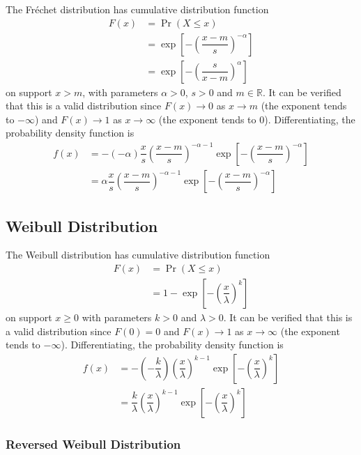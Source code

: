 \documentclass[11pt]{report} %
\begin{document}
The Fr\'{e}chet distribution has cumulative distribution function
\begin{align}
F\left(x\right) &= \operatorname{Pr}\left(X \leq x\right) \\
&= \exp\left[-\left(\dfrac{x - m}{s}\right)^{-\alpha}\right] \\
&= \exp\left[-\left(\dfrac{s}{x - m}\right)^{\alpha}\right]
\end{align}
on support $x > m$, with parameters $\alpha > 0$, $s > 0$ and $m \in \mathbb{R}$. It can be verified that this is a valid distribution since $F\left(x\right) \to 0$ as $x \to m$ (the exponent tends to $-\infty$) and $F\left(x\right) \to 1$ as $x \to \infty$ (the exponent tends to $0$). Differentiating, the probability density function is
\begin{align}
f\left(x\right) &= -\left(-\alpha\right)\dfrac{x}{s}\left(\dfrac{x - m}{s}\right)^{-\alpha - 1}\exp\left[-\left(\dfrac{x - m}{s}\right)^{-\alpha}\right] \\
&= \alpha\dfrac{x}{s}\left(\dfrac{x - m}{s}\right)^{-\alpha - 1}\exp\left[-\left(\dfrac{x - m}{s}\right)^{-\alpha}\right]
\end{align}

\subsection{Weibull Distribution}

The Weibull distribution has cumulative distribution function
\begin{align}
F\left(x\right) &= \operatorname{Pr}\left(X \leq x\right) \\
&= 1 - \exp\left[-\left(\dfrac{x}{\lambda}\right)^{k}\right]
\end{align}
on support $x \geq 0$ with parameters $k > 0$ and $\lambda > 0$. It can be verified that this is a valid distribution since $F\left(0\right) = 0$ and $F\left(x\right) \to 1$ as $x \to \infty$ (the exponent tends to $-\infty$). Differentiating, the probability density function is
\begin{align}
f\left(x\right) &= -\left(-\dfrac{k}{\lambda}\right)\left(\dfrac{x}{\lambda}\right)^{k - 1}\exp\left[-\left(\dfrac{x}{\lambda}\right)^{k}\right] \\
&= \dfrac{k}{\lambda}\left(\dfrac{x}{\lambda}\right)^{k - 1}\exp\left[-\left(\dfrac{x}{\lambda}\right)^{k}\right]
\end{align}

\subsubsection{Reversed Weibull Distribution}
\end{document}
